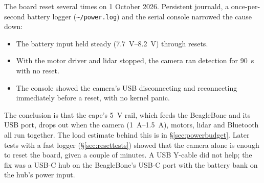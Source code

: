 The board reset several times on 1 October 2026. Persistent journald, a
once-per-second battery logger (\texttt{\textasciitilde/power.log}) and the
serial console narrowed the cause down:
\begin{itemize}
\item The battery input held steady (\SIrange{7.7}{8.2}{V}) through resets.
\item With the motor driver and lidar stopped, the camera ran detection for
  \SI{90}{s} with no reset.
\item The console showed the camera's USB disconnecting and reconnecting
  immediately before a reset, with no kernel panic.
\end{itemize}
The conclusion is that the cape's \SI{5}{V} rail, which feeds the BeagleBone
and its USB port, drops out when the camera (\SIrange{1}{1.5}{A}), motors,
lidar and Bluetooth all run together. The load estimate behind this is in
\S\ref{sec:powerbudget}. Later tests with a fast logger
(\S\ref{sec:resettests}) showed that the camera alone is enough to reset
the board, given a couple of minutes. A USB Y-cable did not help; the fix
was a USB-C hub on the BeagleBone's USB-C port with the battery bank on the
hub's power input.
